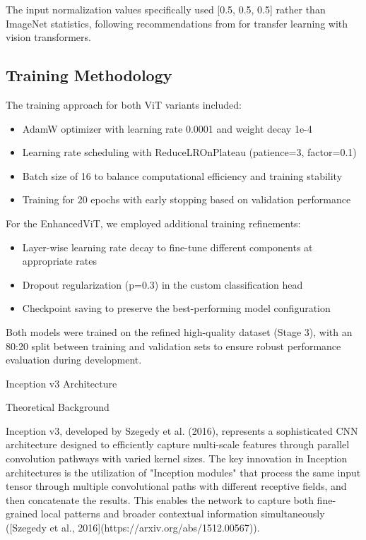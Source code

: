 \documentclass[a4paper,12pt]{article}
\begin{document}
The input normalization values specifically used [0.5, 0.5, 0.5] rather than ImageNet statistics, following recommendations from\citep{touvron2021training} for transfer learning with vision transformers.

\subsection{Training Methodology}

The training approach for both ViT variants included:

\begin{itemize}
    \item AdamW optimizer with learning rate 0.0001 and weight decay 1e-4
    \item Learning rate scheduling with ReduceLROnPlateau (patience=3, factor=0.1)
    \item Batch size of 16 to balance computational efficiency and training stability
    \item Training for 20 epochs with early stopping based on validation performance
\end{itemize}

For the EnhancedViT, we employed additional training refinements:

\begin{itemize}
    \item Layer-wise learning rate decay to fine-tune different components at appropriate rates
    \item Dropout regularization (p=0.3) in the custom classification head
    \item Checkpoint saving to preserve the best-performing model configuration
\end{itemize}

Both models were trained on the refined high-quality dataset (Stage 3), with an 80:20 split between training and validation sets to ensure robust performance evaluation during development.


 Inception v3 Architecture

 Theoretical Background

Inception v3, developed by Szegedy et al. (2016), represents a sophisticated CNN architecture designed to efficiently capture multi-scale features through parallel convolution pathways with varied kernel sizes. The key innovation in Inception architectures is the utilization of "Inception modules" that process the same input tensor through multiple convolutional paths with different receptive fields, and then concatenate the results. This enables the network to capture both fine-grained local patterns and broader contextual information simultaneously ([Szegedy et al., 2016](https://arxiv.org/abs/1512.00567)).
\end{document}
